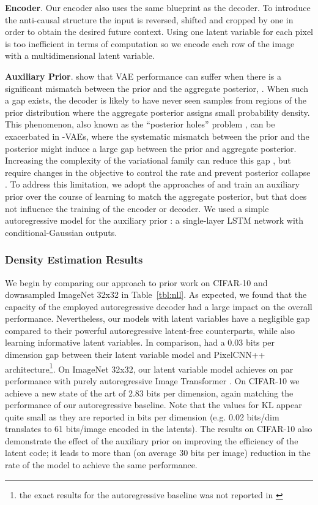 \documentclass{article} \usepackage{iclr2019_conference,times}
\newcommand{\tblref}[1]{Table~\ref{#1}}
\begin{document}
\par
\textbf{Encoder}. Our encoder also uses the same blueprint as the decoder. To introduce the anti-causal structure the input is reversed, shifted and cropped by one in order to obtain the desired future context. Using one latent variable for each pixel is too inefficient in terms of computation so we encode each row of the image with a multidimensional latent variable.

\par
\textbf{Auxiliary Prior}.
\cite{vamprior, Hoffman2016, Geco} show that VAE performance can suffer when there is a significant mismatch between the
prior and the aggregate posterior, . When such a gap exists, the decoder is likely to have never seen samples from regions of the prior distribution where the aggregate posterior assigns small probability density.
This phenomenon, also known as the ``posterior holes'' problem \citep{Geco}, can be exacerbated in -VAEs, where the systematic mismatch between the prior and the posterior might induce a large gap between the prior and aggregate posterior. Increasing the complexity of the variational family can reduce this gap \citep{NF}, but require changes in the objective to control the rate and prevent posterior collapse \citep{IAF}. To address this limitation, we adopt the approaches of \citet{VQVAE, roy2018theory} and train an auxiliary prior over the course of learning to match the aggregate posterior, but that does not influence the training of the encoder or decoder. We used a simple autoregressive model for the auxiliary prior : a single-layer LSTM network with conditional-Gaussian outputs.

\subsubsection{Density Estimation Results}
We begin by comparing our approach to prior work on CIFAR-10 and downsampled ImageNet 32x32 in \tblref{tbl:nll}.
As expected, we found that the capacity of the employed autoregressive decoder had a large impact on the overall performance. Nevertheless, our models with latent variables have a negligible gap compared to their powerful autoregressive latent-free counterparts, while also learning informative latent variables. In comparison, \citep{VLAE} had a 0.03 bits per dimension gap between their latent variable model and PixelCNN++ architecture\footnote{the exact results for the autoregressive baseline was not reported in \cite{VLAE}}. On ImageNet 32x32, our latent variable model achieves on par performance with purely autoregressive Image Transformer \citep{ImageTransformer}. On CIFAR-10 we achieve a new state of the art of 2.83 bits per dimension, again matching the performance of our autoregressive baseline. Note that the values for KL appear quite small as they are reported in bits per dimension (e.g. 0.02 bits/dim translates to 61 bits/image encoded in the latents). The results on CIFAR-10 also demonstrate the effect of the auxiliary prior on improving the efficiency of the latent code; it leads to more than  (on average 30 bits per image) reduction in the rate of the model to achieve the same performance.
\end{document}
